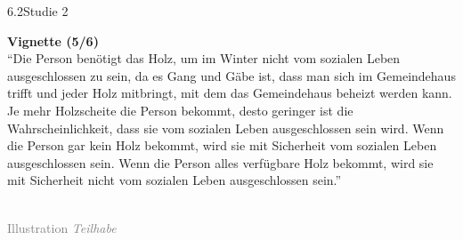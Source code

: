 \documentclass[xcolor=table,9pt,aspectratio=169]{beamer}
\begin{document}
\begin{frame}{\vspace*{10mm}6.2\hspace*{1em}Studie 2}
\begin{multicols}{2}
   \textbf{Vignette (5/6)}\\
   \medskip
   \enquote{Die Person benötigt das Holz, um im Winter nicht vom sozialen Leben ausgeschlossen zu sein, da es Gang und Gäbe ist, dass man sich im Gemeindehaus trifft und jeder Holz mitbringt, mit dem das Gemeindehaus beheizt werden kann. Je mehr Holzscheite die Person bekommt, desto geringer ist die Wahrscheinlichkeit, dass sie vom sozialen Leben ausgeschlossen sein wird. Wenn die Person gar kein Holz bekommt, wird sie mit Sicherheit vom sozialen Leben ausgeschlossen sein. Wenn die Person alles verfügbare Holz bekommt, wird sie mit Sicherheit nicht vom sozialen Leben ausgeschlossen sein.}\\
   \vfill
   \begin{center}
      \\
      \textcolor{gray}{Illustration \textit{Teilhabe}}
   \end{center}
\end{multicols}
\end{frame}
\end{document}
